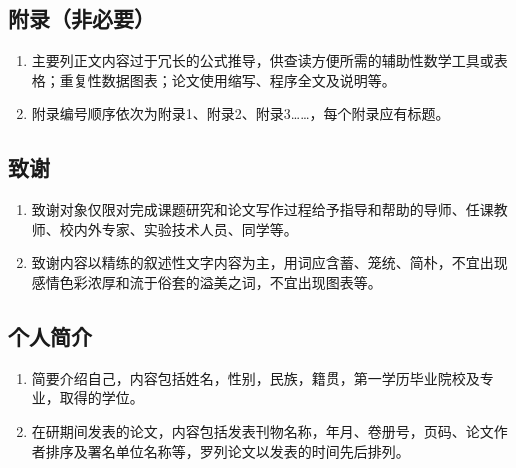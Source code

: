 \subsection{附录（非必要）}

\begin{enumerate}[label=\arabic*)]
	\item 主要列正文内容过于冗长的公式推导，供查读方便所需的辅助性数学工具或表格；重复性数据图表；论文使用缩写、程序全文及说明等。
	
	\item 附录编号顺序依次为附录1、附录2、附录3……，每个附录应有标题。
	
\end{enumerate}

\subsection{致谢}

\begin{enumerate}[label=\arabic*)]
	\item 致谢对象仅限对完成课题研究和论文写作过程给予指导和帮助的导师、任课教师、校内外专家、实验技术人员、同学等。
	
	\item 致谢内容以精练的叙述性文字内容为主，用词应含蓄、笼统、简朴，不宜出现感情色彩浓厚和流于俗套的溢美之词，不宜出现图表等。
	
\end{enumerate}

\subsection{个人简介}

\begin{enumerate}[label=\arabic*)]
	\item 简要介绍自己，内容包括姓名，性别，民族，籍贯，第一学历毕业院校及专业，取得的学位。
	
	\item 在研期间发表的论文，内容包括发表刊物名称，年月、卷册号，页码、论文作者排序及署名单位名称等，罗列论文以发表的时间先后排列。
	
\end{enumerate}

